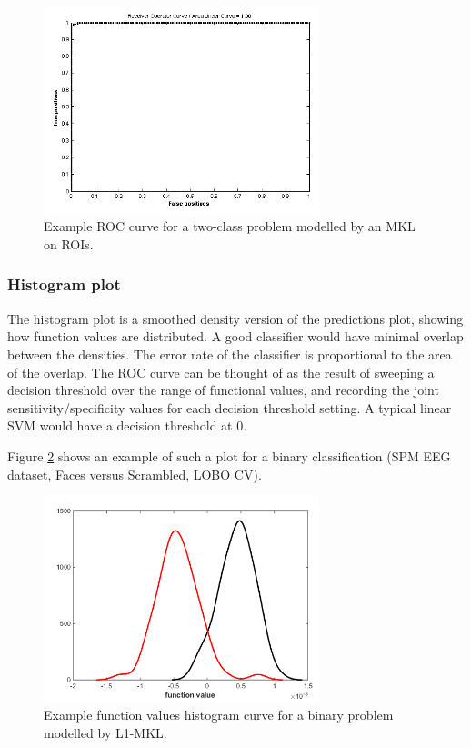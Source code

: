 \begin{figure}[h!]
\begin{center}
\includegraphics[height=6cm]{images/prt_ui_results_plots_ROC.png}
\caption{Example ROC curve for a two-class problem modelled by an MKL on ROIs.}
\label{fig_prt_ui_results_plots_ROC}
\end{center}
\end{figure}

\subsubsection{Histogram plot}

The histogram plot is a smoothed density version of the predictions
plot, showing how function values are distributed. A good classifier
would have minimal overlap between the densities. The error rate of the
classifier is proportional to the area of the overlap. The ROC curve can 
be thought of as the result of sweeping a decision threshold over the range
of functional values, and recording the joint sensitivity/specificity values
for each decision threshold setting. A typical linear SVM would have a decision
threshold at 0.

Figure \ref{fig_prt_ui_results_plots_hist} shows an example of such a plot for a binary classification (SPM EEG dataset, Faces versus Scrambled, LOBO CV).


\begin{figure}[h!]
\begin{center}
\includegraphics[width=8cm]{images/prt_ui_results_plots_hist.png}
\caption{Example function values histogram curve for a binary problem modelled by L1-MKL.}
\label{fig_prt_ui_results_plots_hist}
\end{center}
\end{figure}

